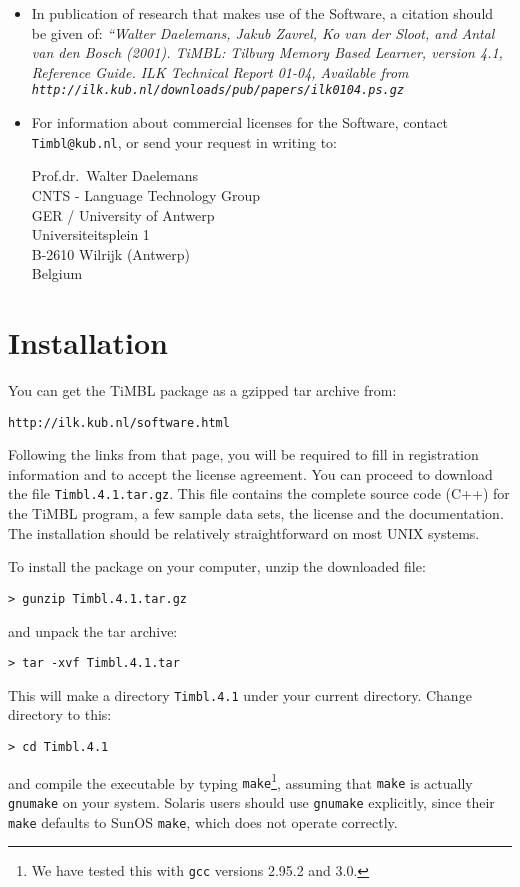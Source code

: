 \documentclass{report}
\begin{document}
\begin{itemize}
\item In publication of research that makes use of the Software, a
citation should be given of: {\em ``Walter Daelemans, Jakub Zavrel, Ko
van der Sloot, and Antal van den Bosch (2001). TiMBL: Tilburg Memory
Based Learner, version 4.1, Reference Guide. ILK Technical Report
01-04, Available from {\tt
http://ilk.kub.nl/downloads/pub/papers/ilk0104.ps.gz}}

\item For information about commercial licenses for the Software,
contact {\tt Timbl@kub.nl}, or send your request in writing to:

Prof.dr.~Walter Daelemans\\
CNTS - Language Technology Group\\
GER / University of Antwerp\\
Universiteitsplein 1\\
B-2610 Wilrijk (Antwerp)\\
Belgium

\end{itemize}

\pagestyle{headings}

\chapter{Installation}
\vspace{-1cm}
You can get the TiMBL package as a gzipped tar archive from:

{\tt http://ilk.kub.nl/software.html}

Following the links from that page, you will be required to fill in
registration information and to accept the license agreement. You can
proceed to download the file {\tt Timbl.4.1.tar.gz}. This file contains
the complete source code (C++) for the TiMBL program, a few sample
data sets, the license and the documentation. The installation should
be relatively straightforward on most UNIX systems.

To install the package on your computer, unzip the downloaded file:

{\tt > gunzip Timbl.4.1.tar.gz}

and unpack the tar archive:

{\tt > tar -xvf Timbl.4.1.tar}

This will make a directory {\tt Timbl.4.1} under your 
current directory. Change directory to this:

{\tt > cd Timbl.4.1}

and compile the executable by typing {\tt make}\footnote{We have
tested this with {\tt gcc} versions 2.95.2 and 3.0.}, assuming that
{\tt make} is actually {\tt gnumake} on your system.  Solaris users
should use {\tt gnumake} explicitly, since their {\tt make} defaults
to SunOS {\tt make}, which does not operate correctly.
\end{document}
